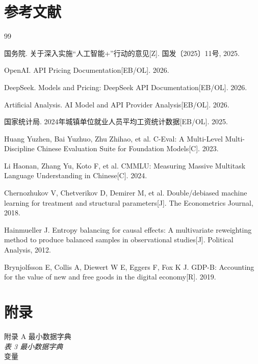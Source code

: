 \begingroup\small\setlength{\parskip}{0.35em}

\section{参考文献}
\begin{thebibliography}{99}

国务院. 关于深入实施“人工智能+”行动的意见[Z]. 国发〔2025〕11号, 2025.

OpenAI. API Pricing Documentation[EB/OL]. 2026.

DeepSeek. Models and Pricing: DeepSeek API Documentation[EB/OL]. 2026.

Artificial Analysis. AI Model and API Provider Analysis[EB/OL]. 2026.

国家统计局. 2024年城镇单位就业人员平均工资统计数据[EB/OL]. 2025.

Huang Yuzhen, Bai Yuzhuo, Zhu Zhihao, et al. C-Eval: A Multi-Level Multi-Discipline Chinese Evaluation Suite for Foundation Models[C]. 2023.

Li Haonan, Zhang Yu, Koto F, et al. CMMLU: Measuring Massive Multitask Language Understanding in Chinese[C]. 2024.

Chernozhukov V, Chetverikov D, Demirer M, et al. Double/debiased machine learning for treatment and structural parameters[J]. The Econometrics Journal, 2018.

Hainmueller J. Entropy balancing for causal effects: A multivariate reweighting method to produce balanced samples in observational studies[J]. Political Analysis, 2012.

Brynjolfsson E, Collis A, Diewert W E, Eggers F, Fox K J. GDP-B: Accounting for the value of new and free goods in the digital economy[R]. 2019.

\end{thebibliography}
\section{附录}

附录 A  最小数据字典\\

\textit{表 3  最小数据字典}\\

变量\\

